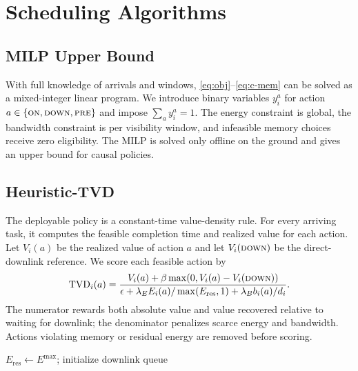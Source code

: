 \section{Scheduling Algorithms}
\label{sec:policy}

\subsection{MILP Upper Bound}
With full knowledge of arrivals and windows, \cref{eq:obj}--\cref{eq:c-mem} can be solved as a mixed-integer linear program. We introduce binary variables $y_i^a$ for action $a\in\{\textsc{on},\textsc{down},\textsc{pre}\}$ and impose $\sum_a y_i^a=1$. The energy constraint is global, the bandwidth constraint is per visibility window, and infeasible memory choices receive zero eligibility. The MILP is solved only offline on the ground and gives an upper bound for causal policies.

\subsection{Heuristic-TVD}
The deployable policy is a constant-time value-density rule. For every arriving task, it computes the feasible completion time and realized value for each action. Let $V_i(a)$ be the realized value of action $a$ and let $V_i(\textsc{down})$ be the direct-downlink reference. We score each feasible action by
\begin{equation}
\mathrm{TVD}_i(a)=
\frac{V_i(a)+\beta\max(0,V_i(a)-V_i(\textsc{down}))}
{\epsilon+\lambda_E E_i(a)/\max(E_{\mathrm{res}},1)+\lambda_B b_i(a)/d_i}.
\label{eq:tvd}
\end{equation}
The numerator rewards both absolute value and value recovered relative to waiting for downlink; the denominator penalizes scarce energy and bandwidth. Actions violating memory or residual energy are removed before scoring.

\begin{algorithm}[tb]
\small
\caption{Heuristic-TVD Online Scheduling}
\label{alg:policy}
$E_{\mathrm{res}}\leftarrow E^{\max}$; initialize downlink queue\;
\end{algorithm}

